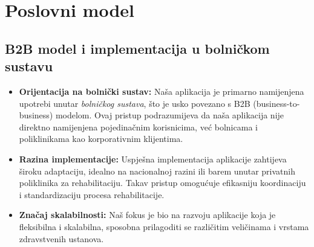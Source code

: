         \eject
        
        

        \section*{Poslovni model}
        
        \subsection*{B2B model i implementacija u bolničkom sustavu}
        \begin{itemize}
            \item \textbf{Orijentacija na bolnički sustav:} Naša aplikacija je primarno namijenjena upotrebi unutar \textit{bolničkog sustava}, što je usko povezano s B2B (business-to-business) modelom. Ovaj pristup podrazumijeva da naša aplikacija nije direktno namijenjena pojedinačnim korisnicima, već bolnicama i poliklinikama kao korporativnim klijentima.
            
            \item \textbf{Razina implementacije:} Uspješna implementacija aplikacije zahtijeva široku adaptaciju, idealno na nacionalnoj razini ili barem unutar privatnih poliklinika za rehabilitaciju. Takav pristup omogućuje efikasniju koordinaciju i standardizaciju procesa rehabilitacije.
            
            \item \textbf{Značaj skalabilnosti:} Naš fokus je bio na razvoju aplikacije koja je fleksibilna i skalabilna, sposobna prilagoditi se različitim veličinama i vrstama zdravstvenih ustanova.
        \end{itemize}
        
